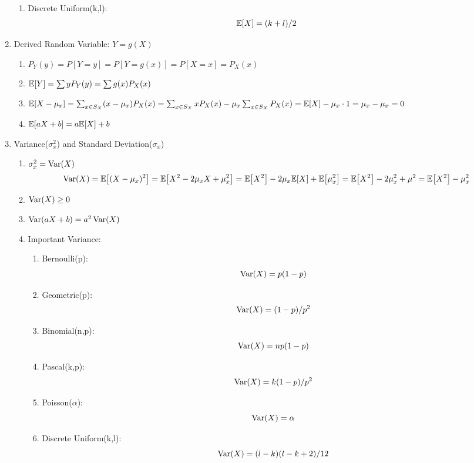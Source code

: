 \begin{enumerate}
{\begin{enumerate}
{\begin{enumerate}
{\begin{enumerate}
                            \item Discrete Uniform(k,l): $$\E{X}=(k+l)/2$$
                        \end{enumerate}
                    }
                \end{enumerate}
            }
        \end{enumerate}
    }
    \item Derived Random Variable: $Y = g(X)${
        \begin{enumerate}
            \item $P_Y(y) = P[Y=y] = P[Y=g(x)] = P[X=x] = P_X(x)$
            \item $\E{Y} = \sum yP_Y(y) = \sum g(x)P_X(x)$
            \item $\E{X-\mu_x}=\sum_{x\in S_X}(x-\mu_x)P_X(x)=\sum_{x\in S_X}xP_X(x)-\mu_x\sum_{x\in S_X}P_X(x)=\E{X}-\mu_x\cdot 1=\mu_x-\mu_x=0$
            \item $\E{aX+b}=a\E{X}+b$
        \end{enumerate}
    }
    \item Variance($\sigma_x^2$) and Standard Deviation($\sigma_x$){
        \begin{enumerate}
            \item $\sigma_x^2=\mathop{\mathrm{Var}}\nolimits(X)$ $$\Var(X)=\E{(X-\mu_x)^2}=\E{X^2-2\mu_xX+\mu_x^2}=\E{X^2}-2\mu_x\E{X}+\E{\mu_x^2}=\E{X^2}-2\mu_x^2+\mu^2=\E{X^2}-\mu_x^2$$
            \item $\mathop{\mathrm{Var}}\nolimits(X)\geq 0$
            \item $\mathop{\mathrm{Var}}\nolimits(aX+b)=a^2\mathop{\mathrm{Var}}\nolimits(X)$
            \item Important Variance:{
                \begin{enumerate}
                    \item Bernoulli(p): $$\mathop{\mathrm{Var}}\nolimits(X)=p(1-p)$$
                    \item Geometric(p): $$\mathop{\mathrm{Var}}\nolimits(X)=(1-p)/p^2$$
                    \item Binomial(n,p): $$\mathop{\mathrm{Var}}\nolimits(X)=np(1-p)$$
                    \item Pascal(k,p): $$\mathop{\mathrm{Var}}\nolimits(X)=k(1-p)/p^2$$
                    \item Poisson($\alpha$): $$\mathop{\mathrm{Var}}\nolimits(X)=\alpha$$
                    \item Discrete Uniform(k,l): $$\mathop{\mathrm{Var}}\nolimits(X)=(l-k)(l-k+2)/12$$
                \end{enumerate}
            }
        \end{enumerate}
    }
\end{enumerate}